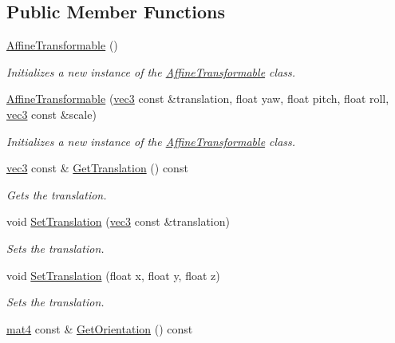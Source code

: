 \subsection*{Public Member Functions}
\begin{DoxyCompactItemize}
\item 
\hyperlink{class_affine_transformable_a54fbbe0cdde13ea581dce04ec0de8545}{Affine\+Transformable} ()
\begin{DoxyCompactList}\small\item\em Initializes a new instance of the \hyperlink{class_affine_transformable}{Affine\+Transformable} class. \end{DoxyCompactList}\item 
\hyperlink{class_affine_transformable_ab70fc4cbb5d5d3436d4e6fc50ccb1cc7}{Affine\+Transformable} (\hyperlink{_types_8h_a3d0ce73e3199de81565fb01632415288}{vec3} const \&translation, float yaw, float pitch, float roll, \hyperlink{_types_8h_a3d0ce73e3199de81565fb01632415288}{vec3} const \&scale)
\begin{DoxyCompactList}\small\item\em Initializes a new instance of the \hyperlink{class_affine_transformable}{Affine\+Transformable} class. \end{DoxyCompactList}\item 
\hyperlink{_types_8h_a3d0ce73e3199de81565fb01632415288}{vec3} const \& \hyperlink{class_affine_transformable_a6c6a849bb0dc120cdb96494aa40c6898}{Get\+Translation} () const 
\begin{DoxyCompactList}\small\item\em Gets the translation. \end{DoxyCompactList}\item 
void \hyperlink{class_affine_transformable_abd554f0c81205675ed2a6520e09e5b98}{Set\+Translation} (\hyperlink{_types_8h_a3d0ce73e3199de81565fb01632415288}{vec3} const \&translation)
\begin{DoxyCompactList}\small\item\em Sets the translation. \end{DoxyCompactList}\item 
void \hyperlink{class_affine_transformable_a47eccc886862946587d6e9de46f55dff}{Set\+Translation} (float x, float y, float z)
\begin{DoxyCompactList}\small\item\em Sets the translation. \end{DoxyCompactList}\item 
\hyperlink{_types_8h_a2db59f395fe82a7394c6324956c265d8}{mat4} const \& \hyperlink{class_affine_transformable_a891419484ac01da747f832e5a84e8e37}{Get\+Orientation} () const 

\end{DoxyCompactItemize}

